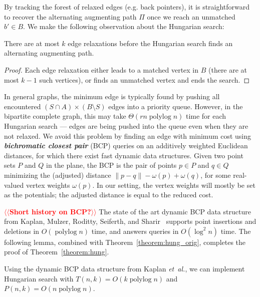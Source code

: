\documentclass[a4paper,UKenglish]{socg-lipics-v2018}
\makeatletter
\def\note#1{\textcolor{red}{{#1}}}
\def\etal{\emph{et~al.}}
\def\etal{\textit{et~al.}}
\def\polylog{\mathop{\mathrm{polylog}}}
\theoremstyle{plain}
\numberwithin{figure}{section}
\def\EMPH#1{\textbf{\emph{\boldmath #1}}}
\def\n@te#1{\textsf{\boldmath \textbf{$\langle\!\langle$#1$\rangle\!\rangle$}}\leavevmode}
\def\note#1{\textcolor{red}{\n@te{#1}}}
\makeatother
\begin{document}
By tracking the forest of relaxed edges (e.g. back pointers), it is
straightforward to recover the alternating augmenting path $\Pi$ once we reach
an unmatched $b' \in B$.
We make the following observation about the Hungarian search:

\begin{lemma}
\label{lemma:hungsearch_length}
There are at most $k$ edge relaxations before the Hungarian search finds an
alternating augmenting path.
\end{lemma}

\begin{proof}
Each edge relaxation either leads to a matched vertex in $B$ (there are at most
$k-1$ such vertices), or finds an unmatched vertex and ends the search.
\end{proof}

In general graphs, the minimum edge is typically found by pushing all
encountered $(S \cap A) \times (B \setminus S)$ edges into a priority queue.
However, in the bipartite complete graph, this may take $\Theta(rn\polylog n)$
time for each Hungarian search --- edges are being pushed into the queue even when
they are not relaxed.
We avoid this problem by finding an edge with minimum cost using \EMPH{bichromatic
closest pair} (BCP) queries on an additively weighted Euclidean distances,
for which there exist fast dynamic data structures.
Given two point sets $P$ and $Q$ in the plane, the BCP is the pair of points
$p \in P$ and $q \in Q$ minimizing the (adjusted) distance
$\|p - q\| - \omega(p) + \omega(q)$, for some real-valued vertex weights
$\omega(p)$.
In our setting, the vertex weights will mostly be set as the potentials; the
adjusted distance is equal to the reduced cost.

\note{Short history on BCP?}
The state of the art dynamic BCP data structure from Kaplan, Mulzer,
Roditty, Seiferth, and Sharir~\cite{KMRSS17} supports point insertions and deletions in
$O(\polylog n)$ time, and answers queries in $O(\log^2 n)$ time.
The following lemma, combined with Theorem~\ref{theorem:hung_orig}, completes
the proof of Theorem~\ref{theorem:hung}.

\begin{lemma}
\label{lemma:hs_time}
Using the dynamic BCP data structure from Kaplan \etal, we can implement
Hungarian search with $T(n, k) = O(k\polylog n)$ and
$P(n, k) = O(n\polylog n)$.
\end{lemma}
\end{document}
